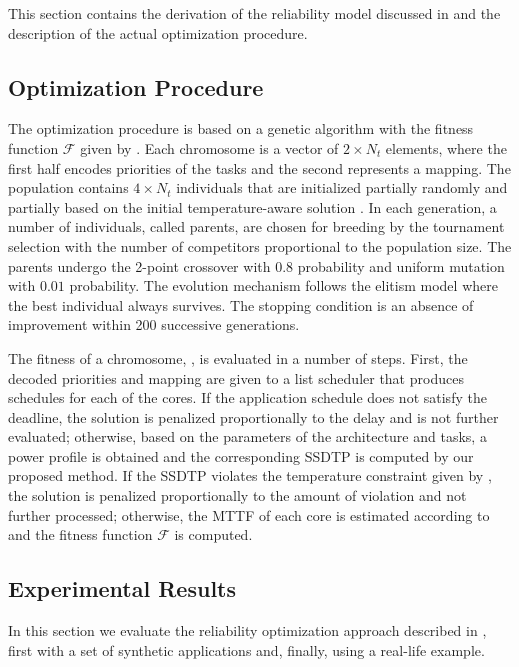 This section contains the derivation of the reliability model discussed in
 and the description of the actual optimization
procedure.

\subsection{Optimization Procedure}

The optimization procedure is based on a genetic algorithm \cite{schmitz2004}
with the fitness function $\mathcal{F}$ given by . Each
chromosome is a vector of $2 \times N_t$ elements, where the first half encodes
priorities of the tasks and the second represents a mapping. The population
contains $4 \times N_t$ individuals that are initialized partially randomly and
partially based on the initial temperature-aware solution \cite{xie2006}. In
each generation, a number of individuals, called parents, are chosen for
breeding by the tournament selection with the number of competitors proportional
to the population size. The parents undergo the 2-point crossover with $0.8$
probability and uniform mutation with $0.01$ probability. The evolution
mechanism follows the elitism model where the best individual always survives.
The stopping condition is an absence of improvement within 200 successive
generations.

The fitness of a chromosome, , is evaluated in a number
of steps. First, the decoded priorities and mapping are given to a list
scheduler that produces schedules for each of the cores. If the application
schedule does not satisfy the deadline, the solution is penalized proportionally
to the delay and is not further evaluated; otherwise, based on the parameters of
the architecture and tasks, a power profile is obtained and the corresponding
SSDTP is computed by our proposed method. If the SSDTP violates the temperature
constraint given by , the solution is penalized proportionally to
the amount of violation and not further processed; otherwise, the MTTF of each
core is estimated according to  and the fitness function
$\mathcal{F}$ is computed.

\subsection{Experimental Results}

In this section we evaluate the reliability optimization approach described in
, first with a set of synthetic applications and,
finally, using a real-life example.

